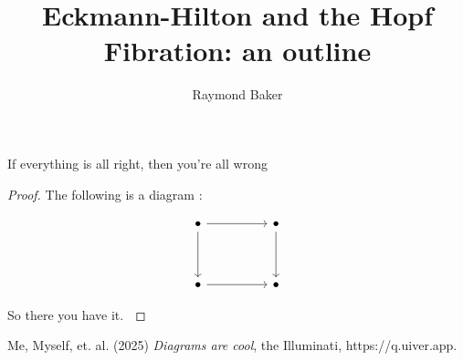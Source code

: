 





\lhead{} \chead{} \rhead{}

\title{Eckmann-Hilton and the Hopf Fibration: an outline}
\author{Raymond Baker}
\date{}


\maketitle

\begin{theorem}

  If everything is all right, then you're all wrong

\end{theorem}

\begin{proof}

  The following is a diagram \cite{DIAG}:

\[\begin{tikzcd}
	\bullet && \bullet \\
	\\
	\bullet && \bullet
	\arrow[from=1-1, to=1-3]
	\arrow[from=1-1, to=3-1]
	\arrow[from=1-3, to=3-3]
	\arrow[from=3-1, to=3-3]
\end{tikzcd}\]

    So there you have it. $\qedhere$
    
\end{proof}

\begin{thebibliography}{9}

 Me, Myself, et. al. (2025) \emph{Diagrams are cool}, the Illuminati, https://q.uiver.app.

\end{thebibliography}



